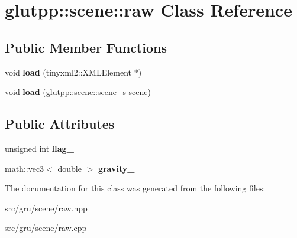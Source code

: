 \hypertarget{classglutpp_1_1scene_1_1raw}{\section{glutpp\-:\-:scene\-:\-:raw \-Class \-Reference}
\label{classglutpp_1_1scene_1_1raw}
}
\subsection*{\-Public \-Member \-Functions}
\begin{DoxyCompactItemize}
\item 
\hypertarget{classglutpp_1_1scene_1_1raw_a5ffd99a526cdf1c9b164dfed043955f7}{void {\bfseries load} (tinyxml2\-::\-X\-M\-L\-Element $\ast$)}\label{classglutpp_1_1scene_1_1raw_a5ffd99a526cdf1c9b164dfed043955f7}

\item 
\hypertarget{classglutpp_1_1scene_1_1raw_a7c6d4bcc40c2382e663e343843986d58}{void {\bfseries load} (glutpp\-::scene\-::scene\-\_\-s \hyperlink{classglutpp_1_1scene_1_1scene}{scene})}\label{classglutpp_1_1scene_1_1raw_a7c6d4bcc40c2382e663e343843986d58}

\end{DoxyCompactItemize}
\subsection*{\-Public \-Attributes}
\begin{DoxyCompactItemize}
\item 
\hypertarget{classglutpp_1_1scene_1_1raw_a7ea24c9872420ab621799bbb2d47c73d}{unsigned int {\bfseries flag\-\_\-}}\label{classglutpp_1_1scene_1_1raw_a7ea24c9872420ab621799bbb2d47c73d}

\item 
\hypertarget{classglutpp_1_1scene_1_1raw_a0d3c7f6ed8f52088132d9912aec7a138}{math\-::vec3$<$ double $>$ {\bfseries gravity\-\_\-}}\label{classglutpp_1_1scene_1_1raw_a0d3c7f6ed8f52088132d9912aec7a138}

\end{DoxyCompactItemize}


\-The documentation for this class was generated from the following files\-:\begin{DoxyCompactItemize}
\item 
src/gru/scene/raw.\-hpp\item 
src/gru/scene/raw.\-cpp\end{DoxyCompactItemize}
